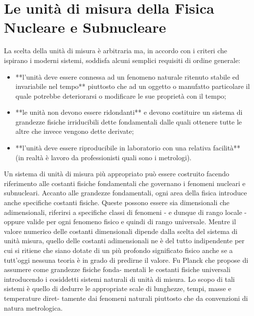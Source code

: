 
\section{Le unità di misura della Fisica Nucleare e Subnucleare}
\label{sec:unita-di-misura}

La scelta della unità di misura è arbitraria ma, in accordo con i criteri che ispirano i moderni sistemi, soddisfa alcuni semplici requisiti di ordine generale:
\begin{itemize}
    \item  **l'unità deve essere connessa ad un fenomeno naturale ritenuto stabile ed invariabile nel tempo** piuttosto che ad un oggetto o manufatto particolare il quale potrebbe deteriorarsi o modificare le sue proprietà con il tempo;
    \item  **le unità non devono essere ridondanti** e devono costituire un sistema di grandezze fisiche irriducibili dette fondamentali dalle quali ottenere tutte le altre che invece vengono dette derivate;
    \item  **l'unità deve essere riproducibile in laboratorio con una relativa facilità** (in realtà è lavoro da professionisti quali sono i metrologi).

\end{itemize}

Un sistema di unità di misura più appropriato può essere costruito facendo riferimento alle costanti fisiche fondamentali che governano i fenomeni nucleari e subnucleari.
Accanto alle grandezze fondamentali, ogni area della fisica introduce anche specifiche costanti fisiche.
Queste possono essere sia dimensionali che adimensionali, riferirsi a specifiche classi di fenomeni - e dunque di rango locale - oppure valide per ogni fenomeno fisico e quindi di rango universale.
Mentre il valore numerico delle costanti dimensionali dipende dalla scelta del sistema di unità misura, quello delle costanti adimensionali ne è del tutto indipendente per cui si ritiene che siano dotate di un più profondo significato fisico anche se a tutt’oggi nessuna teoria è in grado di predirne il valore.
Fu Planck che propose di assumere come grandezze fisiche fonda- mentali le costanti fisiche universali introducendo i cosiddetti sistemi naturali di unità di misura.
Lo scopo di tali sistemi è quello di dedurre le appropriate scale di lunghezze, tempi, masse e temperature diret- tamente dai fenomeni naturali piuttosto che da convenzioni di natura metrologica.


